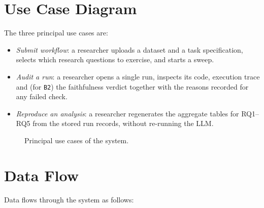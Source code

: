 \section{Use Case Diagram}

The three principal use cases are:

\begin{itemize}
    \item \emph{Submit workflow}: a researcher uploads a dataset
    and a task specification, selects which research questions to
    exercise, and starts a sweep.
    \item \emph{Audit a run}: a researcher opens a single run,
    inspects its code, execution trace and (for \texttt{B2}) the
    faithfulness verdict together with the reasons recorded for any
    failed check.
    \item \emph{Reproduce an analysis}: a researcher regenerates
    the aggregate tables for RQ1--RQ5 from the stored run records,
    without re-running the LLM.
\end{itemize}

\begin{figure}[H]
    \centering
    \caption{Principal use cases of the system.}
    \label{fig:usecase}
\end{figure}

\section{Data Flow}

Data flows through the system as follows:

